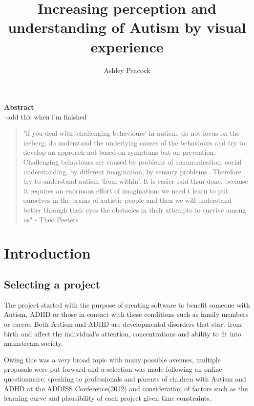 \documentclass[11pt]{report}
\begin{document}
\title{Increasing perception and understanding of Autism by visual experience}
\author{Ashley Peacock}
\maketitle

\textbf{Abstract}\\
--add this when i'm finished 

\begin{quote}
"if you deal with 'challenging behaviours' in autism, do not focus on the iceberg; do understand the underlying causes of the behaviours and try to develop an approach not based on symptoms but on prevention. Challenging behaviours are caused by problems of communication, social understanding, by different imagination, by sensory problems...Therefore try to understand autism 'from within'. It is easier said than done, because it requires an enormous effort of imagination: we need t learn to put ourselves in the brains of autistic people and then we will understand better through their eyes the obstacles in their attempts to survive among us" - Theo Peeters \cite{olgab}
\end{quote}

\tableofcontents

\chapter{Introduction}

\section{Selecting a project}
The project started with the purpose of creating software to benefit someone with Autism, ADHD or those in contact with these conditions such as family members or carers. Both Autism and ADHD are developmental disorders that start from birth and affect the individual's attention, concentrations and ability to fit into mainstream society.

Owing this was a very broad topic with many possible avenues, multiple proposals were put forward and a selection was made following an online questionnaire, speaking to professionals and parents of children with Autism and ADHD at the ADDISS Conference(2012) and consideration of factors such as the learning curve and plausibility of each project given time constraints.
\end{document}

